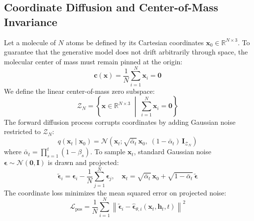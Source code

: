 \documentclass[12pt, a4paper]{article}
\begin{document}
\subsection{Coordinate Diffusion and Center-of-Mass Invariance}
Let a molecule of $N$ atoms be defined by its Cartesian coordinates $\mathbf{x}_0 \in \mathbb{R}^{N \times 3}$. To guarantee that the generative model does not drift arbitrarily through space, the molecular center of mass must remain pinned at the origin:
\begin{equation}
    \mathbf{c}(\mathbf{x}) = \frac{1}{N} \sum_{i=1}^N \mathbf{x}_i = \mathbf{0}
\end{equation}
We define the linear center-of-mass zero subspace:
\begin{equation}
    \mathcal{Z}_N = \left\{ \mathbf{x} \in \mathbb{R}^{N \times 3} \;\middle|\; \sum_{i=1}^N \mathbf{x}_i = \mathbf{0} \right\}
\end{equation}
The forward diffusion process corrupts coordinates by adding Gaussian noise restricted to $\mathcal{Z}_N$:
\begin{equation}
    q(\mathbf{x}_t \mid \mathbf{x}_0) = \mathcal{N}\left(\mathbf{x}_t; \sqrt{\bar{\alpha}_t}\,\mathbf{x}_0,\; (1 - \bar{\alpha}_t)\,\mathbf{I}_{\mathcal{Z}_N}\right)
\end{equation}
where $\bar{\alpha}_t = \prod_{s=1}^t (1 - \beta_s)$. To sample $\mathbf{x}_t$, standard Gaussian noise $\boldsymbol{\epsilon} \sim \mathcal{N}(\mathbf{0}, \mathbf{I})$ is drawn and projected:
\begin{equation}
    \tilde{\boldsymbol{\epsilon}}_i = \boldsymbol{\epsilon}_i - \frac{1}{N} \sum_{j=1}^N \boldsymbol{\epsilon}_j, \quad \mathbf{x}_t = \sqrt{\bar{\alpha}_t}\,\mathbf{x}_0 + \sqrt{1 - \bar{\alpha}_t}\,\tilde{\boldsymbol{\epsilon}}
\end{equation}
The coordinate loss minimizes the mean squared error on projected noise:
\begin{equation}
    \mathcal{L}_\text{pos} = \frac{1}{N} \sum_{i=1}^N \left\| \tilde{\boldsymbol{\epsilon}}_i - \hat{\boldsymbol{\epsilon}}_{\theta, i}(\mathbf{x}_t, \mathbf{h}_t, t) \right\|^2
\end{equation}
\end{document}
